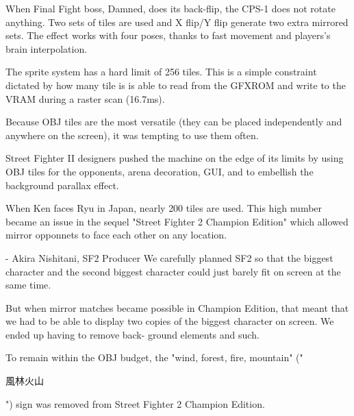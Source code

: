  When Final Fight boss, Damned, does its back-flip, the CPS-1 does not rotate anything. Two sets of tiles are used and X flip/Y flip generate two extra mirrored sets. The effect works with four poses, thanks to fast movement and players's brain interpolation.


\pagebreak

The sprite system has a hard limit of 256 tiles. This is a simple constraint dictated by how many tile is is able to read from the GFXROM and write to the VRAM during a raster scan (16.7ms).

Because OBJ tiles are the most versatile (they can be placed independently and anywhere on the screen), it was tempting to use them often.

Street Fighter II designers pushed the machine on the edge of its limits by using OBJ tiles for the opponents, arena decoration, GUI, and to embellish the background parallax effect.

When Ken faces Ryu in Japan, nearly 200 tiles are used. This high number became an issue in the sequel "Street Fighter 2 Champion Edition" which allowed mirror opponnets to face each other on any location.
\vfill
{}
\pagebreak

\begin{q}{- Akira Nishitani, SF2 Producer}
We carefully planned SF2 so that the biggest character and the second biggest character could just barely fit on screen at the same time. 

But when mirror matches became possible in Champion Edition, that meant that we had to be able to display two copies of the biggest character on screen. We ended up having to remove back- ground elements and such.
\end{q}
To remain within the OBJ budget, the "wind, forest, fire, mountain" ("\begin{CJK}{UTF8}{min}風林火山\end{CJK}") sign was removed from Street Fighter 2 Champion Edition.
\vfill
{}
\pagebreak

\begin{minipage}[t]{0.32\linewidth}
\end{minipage}%
\hfill%
\begin{minipage}[t]{0.32\linewidth}
\end{minipage}
\hfill%
\begin{minipage}[t]{0.32\linewidth}
\end{minipage}


